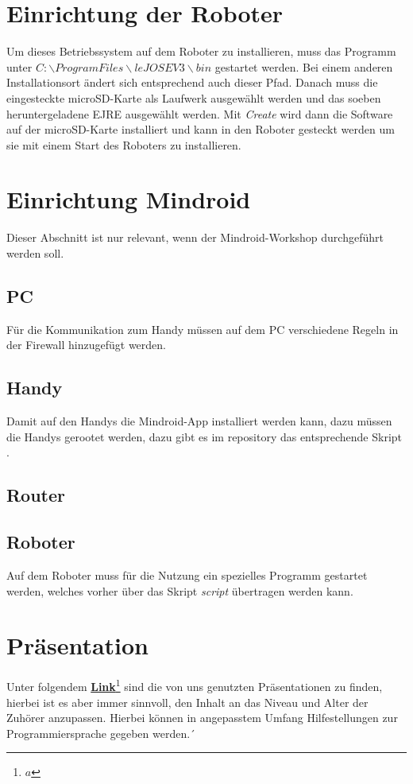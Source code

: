 \documentclass[
	ngerman,
	accentcolor=1c,%
	]{tudapub}
\begin{document}
\section{Einrichtung der Roboter}
Um dieses Betriebssystem auf dem Roboter zu installieren, muss das Programm unter \textit{$C:\backslash Program Files\backslash leJOS EV3\backslash bin$} gestartet werden. Bei einem anderen Installationsort \"andert sich entsprechend auch dieser Pfad.\newline
Danach muss die eingesteckte microSD-Karte als Laufwerk ausgew\"ahlt werden und das soeben heruntergeladene EJRE ausgew\"ahlt werden. Mit \textit{Create} wird dann die Software auf der microSD-Karte installiert und kann in den Roboter gesteckt werden um sie mit einem Start des Roboters zu installieren.

\section{Einrichtung Mindroid}
\label{Einrichtung-Mindroid}
Dieser Abschnitt ist nur relevant, wenn der Mindroid-Workshop durchgef\"uhrt werden soll.

\subsection{PC}
F\"ur die Kommunikation zum Handy m\"ussen auf dem PC verschiedene Regeln in der Firewall hinzugef\"ugt werden.

\subsection{Handy}
Damit auf den Handys die Mindroid-App installiert werden kann, dazu m\"ussen die Handys gerootet werden, dazu gibt es im repository das entsprechende Skript \textit{}.
\subsection{Router}

\subsection{Roboter}
Auf dem Roboter muss f\"ur die Nutzung ein spezielles Programm gestartet werden, welches vorher \"uber das Skript \textit{script} \"ubertragen werden kann.

\section{Pr\"asentation}
Unter folgendem \href{}{\textbf{Link}\footnote{$a$}} 
sind die von uns genutzten Pr\"asentationen zu finden, hierbei ist es aber immer sinnvoll, den Inhalt an das Niveau und Alter der Zuh\"orer anzupassen. Hierbei k\"onnen in angepasstem Umfang Hilfestellungen zur Programmiersprache gegeben werden.´



\cfoot{\textcolor{lightgray} \today}
\end{document}
